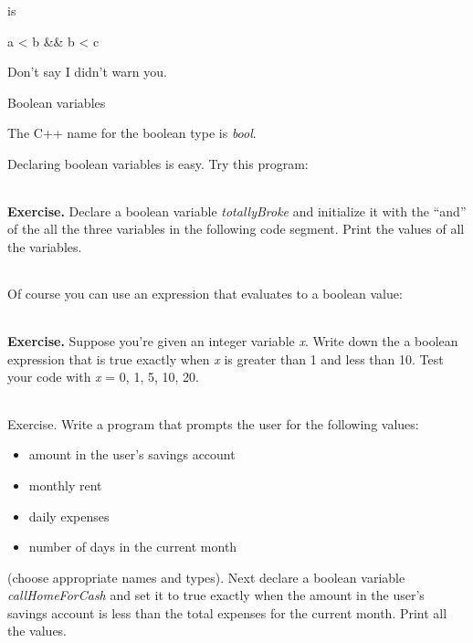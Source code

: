 \documentclass[
]{article}
\providecommand{\tightlist}{%
  \setlength{\itemsep}{0pt}\setlength{\parskip}{0pt}}
\begin{document}
is

a \textless{} b \&\& b \textless{} c

Don't say I didn't warn you.

Boolean variables

The C++ name for the boolean type is \emph{bool}.

Declaring boolean variables is easy. Try this program:

\begin{longtable}[]{@{}@{}}
\toprule
\endhead
\bottomrule
\end{longtable}

\textbf{Exercise.} Declare a boolean variable \emph{totallyBroke} and
initialize it with the ``and'' of the all the three variables in the
following code segment. Print the values of all the variables.

\begin{longtable}[]{@{}@{}}
\toprule
\endhead
\bottomrule
\end{longtable}

Of course you can use an expression that evaluates to a boolean value:

\begin{longtable}[]{@{}@{}}
\toprule
\endhead
\bottomrule
\end{longtable}

\textbf{Exercise.} Suppose you're given an integer variable \emph{x}.
Write down the a boolean expression that is true exactly when \emph{x}
is greater than 1 and less than 10. Test your code with \emph{x} = 0, 1,
5, 10, 20.

\begin{longtable}[]{@{}@{}}
\toprule
\endhead
\bottomrule
\end{longtable}

Exercise. Write a program that prompts the user for the following
values:

\begin{itemize}
\tightlist
\item
  amount in the user's savings account
\item
  monthly rent
\item
  daily expenses
\item
  number of days in the current month
\end{itemize}

(choose appropriate names and types). Next declare a boolean variable
\emph{callHomeForCash} and set it to true exactly when the amount in the
user's savings account is less than the total expenses for the current
month. Print all the values.
\end{document}
